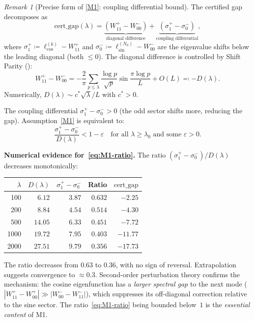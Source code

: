 \documentclass[12pt,a4paper]{article}
\theoremstyle{definition}
\theoremstyle{remark}
\newtheorem{remark}[theorem]{Remark}
\begin{document}
\begin{remark}[Precise form of \ref{M1}: coupling differential bound]
\label{rem:M1-precise}
The certified gap decomposes as
\begin{equation}
\label{eq:gap-decomp}
  \mathrm{cert\_gap}(\lambda) = \underbrace{(W_{11}^+ - W_{00}^-)}_{\text{diagonal difference}} + \underbrace{(\sigma^+_1 - \sigma^-_0)}_{\text{coupling differential}},
\end{equation}
where $\sigma^+_1 \coloneqq \ell_{\cos}^{(k)} - W_{11}^+$ and $\sigma^-_0 \coloneqq \ell_{\sin}^{(N_0)} - W_{00}^-$ are the eigenvalue shifts below the leading diagonal (both $\leq 0$). The diagonal difference is controlled by Shift Parity ():
\[
  W_{11}^+ - W_{00}^- = -\frac{2}{\pi}\sum_{p \leq \lambda}\frac{\log p}{\sqrt{p}}\sin\frac{\pi\log p}{L} + O(L) \eqqcolon -D(\lambda).
\]
Numerically, $D(\lambda) \sim c^*\sqrt{\lambda}/L$ with $c^* > 0$.

The coupling differential $\sigma^+_1 - \sigma^-_0 > 0$ (the odd sector shifts more, reducing the gap). Assumption~\ref{M1} is equivalent to:
\begin{equation}
\label{eq:M1-ratio}
  \frac{\sigma^+_1 - \sigma^-_0}{D(\lambda)} < 1 - \varepsilon \quad\text{for all } \lambda \geq \lambda_0 \text{ and some } \varepsilon > 0.
\end{equation}
\end{remark}

\noindent\textbf{Numerical evidence for~\eqref{eq:M1-ratio}.} The ratio $(\sigma^+_1 - \sigma^-_0)/D(\lambda)$ decreases monotonically:

\begin{center}
\small
\renewcommand{\arraystretch}{1.15}
\begin{tabular}{r|r|r|r|r}
$\lambda$ & $D(\lambda)$ & $\sigma_1^+\! -\! \sigma_0^-$ & Ratio & $\mathrm{cert\_gap}$ \\\hline
100  & $6.12$  & $3.87$ & $0.632$ & $-2.25$ \\
200  & $8.84$  & $4.54$ & $0.514$ & $-4.30$ \\
500  & $14.05$ & $6.33$ & $0.451$ & $-7.72$ \\
1000 & $19.72$ & $7.95$ & $0.403$ & $-11.77$ \\
2000 & $27.51$ & $9.79$ & $0.356$ & $-17.73$
\end{tabular}
\end{center}

\noindent The ratio decreases from $0.63$ to $0.36$, with no sign of reversal. Extrapolation suggests convergence to $\approx 0.3$. Second-order perturbation theory confirms the mechanism: the cosine eigenfunction has a \emph{larger spectral gap} to the next mode ($|W_{11}^+ - W_{00}^+| \gg |W_{00}^- - W_{11}^-|$), which suppresses its off-diagonal correction relative to the sine sector. The ratio~\eqref{eq:M1-ratio} being bounded below~$1$ is the \emph{essential content} of M1.
\end{document}
